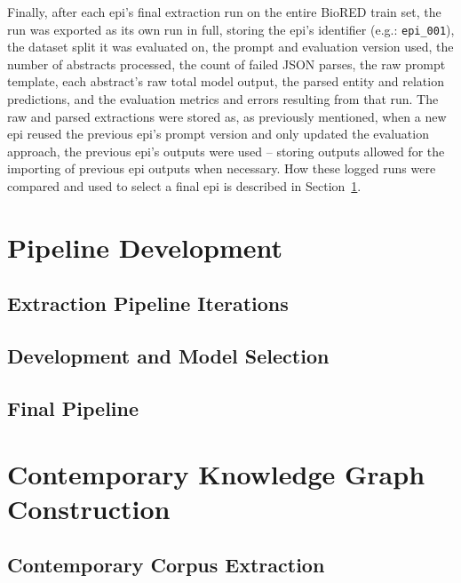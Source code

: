 Finally, after each \gls{epi}'s final extraction run on the entire BioRED train set, the run was exported as its own run in full, storing the \gls{epi}'s identifier (e.g.: \texttt{epi\_001}), the dataset split it was evaluated on, the prompt and evaluation version used, the number of abstracts processed, the count of failed JSON parses, the raw prompt template, each abstract's raw total model output, the parsed entity and relation predictions, and the evaluation metrics and errors resulting from that run. The raw and parsed extractions were stored as, as previously mentioned, when a new \gls{epi} reused the previous \gls{epi}'s prompt version and only updated the evaluation approach, the previous \gls{epi}'s outputs were used -- storing outputs allowed for the importing of previous \gls{epi} outputs when necessary. How these logged runs were compared and used to select a final \gls{epi} is described in Section~\ref{sec:meth:pipeline_development}.

\section{Pipeline Development}
\label{sec:meth:pipeline_development}

\subsection{Extraction Pipeline Iterations}
\label{subsec:meth:extraction_pipeline_iterations}

\subsection{Development and Model Selection}
\label{subsec:meth:development_and_model_selection}

\subsection{Final Pipeline}
\label{subsec:meth:final_pipeline}

\section{Contemporary Knowledge Graph Construction}
\label{sec:meth:contemporary_kg_construction}

\subsection{Contemporary Corpus Extraction}
\label{subsec:meth:contemporary_corpus_extraction}


